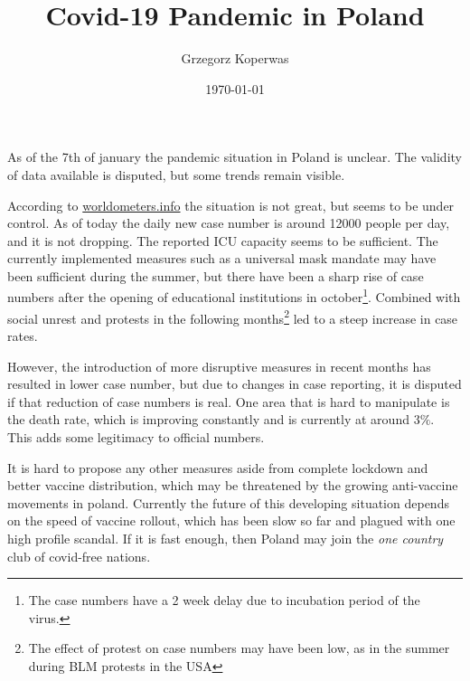 \documentclass[a4paper,12pt]{article}
\title{Covid-19 Pandemic in Poland}
\author{Grzegorz Koperwas}
\date{\today}
\begin{document}
\maketitle
\thispagestyle{fancy}
\nocite{projections}
As of the 7th of january the pandemic situation in Poland is unclear. The validity of data available is disputed, but some trends remain visible. 


According to \url{worldometers.info} the situation is not great, but seems to be under control. As of today the daily new case number is around 12000 people per day, and it is not dropping. The reported ICU capacity seems to be sufficient. The currently implemented measures such as a universal mask mandate may have been sufficient during the summer, but there have been a sharp rise of case numbers after the opening of educational institutions in october\footnote{The case numbers have a 2 week delay due to incubation period of the virus.}. Combined with social unrest and protests in the following months\footnote{The effect of protest on case numbers may have been low, as in the summer during BLM protests in the USA} led to a steep increase in case rates.

However, the introduction of more disruptive measures in recent months has resulted in lower case number, but due to changes in case reporting, it is disputed if that reduction of case numbers is real. One area that is hard to manipulate is the death rate, which is improving constantly and is currently at around $3\%$. This adds some legitimacy to official numbers.

It is hard to propose any other measures aside from complete lockdown and better vaccine distribution, which may be threatened by the growing anti-vaccine movements in poland\cite{key}. Currently the future of this developing situation depends on the speed of vaccine rollout, which has been slow so far and plagued with one high profile scandal. If it is fast enough, then Poland may join the \emph{one country} club of covid-free nations.



\end{document}
